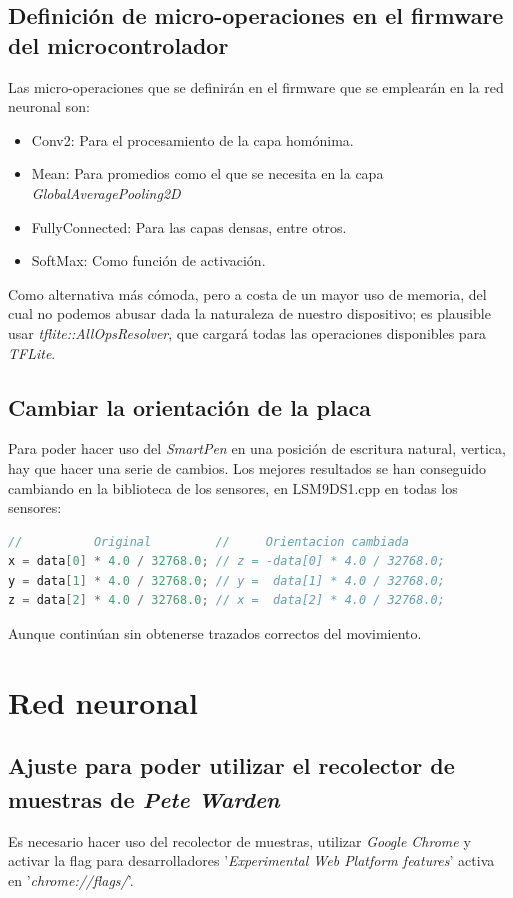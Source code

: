 \begin{appendices}
\section{Definición de micro-operaciones en el firmware del
microcontrolador\label{firmwMO}}
Las micro-operaciones que se definirán en el firmware que
se emplearán en la red neuronal son:
\begin{itemize}
    \itemsep0em 
    \item Conv2: Para el procesamiento de la capa homónima.
    \item Mean: Para promedios como el que se necesita en la capa \textit{GlobalAveragePooling2D}
    \item FullyConnected: Para las capas densas, entre otros.
    \item SoftMax: Como función de activación.
\end{itemize}

Como alternativa más cómoda, pero a costa de un mayor uso de memoria,
del cual no podemos abusar dada la naturaleza de nuestro dispositivo;
es plausible usar \textit{tflite::AllOpsResolver}, que cargará todas las
operaciones disponibles para \textit{TFLite}.


\section{Cambiar la orientación de la placa}
Para poder hacer uso del \textit{SmartPen} en una posición de escritura natural,
vertica, hay que hacer una serie de cambios.
Los mejores resultados se han conseguido cambiando en la biblioteca de los sensores,
en LSM9DS1.cpp en todas los sensores:
\begin{lstlisting}[firstnumber=121,language=c++,title=Fragmento
    de \textit{LSM9DS1.cpp} de la librería homónima]
//          Original         //     Orientacion cambiada
x = data[0] * 4.0 / 32768.0; // z = -data[0] * 4.0 / 32768.0;
y = data[1] * 4.0 / 32768.0; // y =  data[1] * 4.0 / 32768.0;
z = data[2] * 4.0 / 32768.0; // x =  data[2] * 4.0 / 32768.0;
\end{lstlisting}

Aunque continúan sin obtenerse trazados correctos del movimiento.


\chapter{Red neuronal}
\section{Ajuste para poder utilizar el recolector de muestras de
\textit{Pete Warden}\textsuperscript{\cite{petewardenmw}}\label{PWchrome}}
Es necesario hacer uso del recolector de muestras, utilizar \textit{Google Chrome}
y activar la flag para desarrolladores '\textit{Experimental Web Platform features}'
activa en '\textit{chrome://flags/}'.



\end{appendices}
